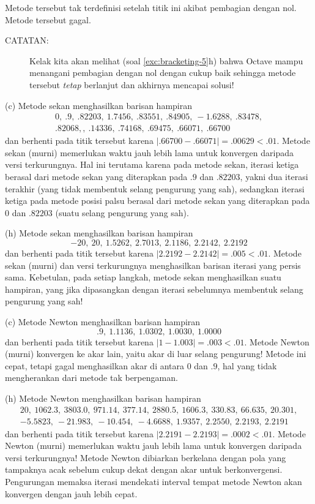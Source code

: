 \begin{description}
Metode tersebut tak terdefinisi setelah titik ini akibat pembagian
dengan nol. Metode tersebut gagal.
\begin{description}
\item [{CATATAN:}] Kelak kita akan melihat (soal \ref{exc:bracketing-5}h)
bahwa Octave mampu menangani pembagian dengan nol dengan cukup baik
sehingga metode tersebut \textit{tetap} berlanjut dan akhirnya mencapai
solusi!
\end{description}
\item [{\ref{exc:bracketing-2}:}] (c) Metode sekan menghasilkan barisan
hampiran
\[
\begin{gathered}0,\ .9,\ .82203,\ 1.7456,\ .83551,\ .84905,\ -1.6288,\ .83478,\\
.82068,,\ .14336,\ .74168,\ .69475,\ .66071,\ .66700
\end{gathered}
\]
dan berhenti pada titik tersebut karena $|.66700-.66071|=.00629<.01$.
Metode sekan (murni) memerlukan waktu jauh lebih lama untuk konvergen
daripada versi terkurungnya. Hal ini terutama karena pada metode sekan,
iterasi ketiga berasal dari metode sekan yang diterapkan pada $.9$
dan $.82203$, yakni dua iterasi terakhir (yang tidak membentuk selang
pengurung yang sah), sedangkan iterasi ketiga pada metode posisi palsu
berasal dari metode sekan yang diterapkan pada $0$ dan $.82203$
(suatu selang pengurung yang sah).

(h) Metode sekan menghasilkan barisan hampiran
\[
-20,\ 20,\ 1.5262,\ 2.7013,\ 2.1186,\ 2.2142,\ 2.2192
\]
dan berhenti pada titik tersebut karena $|2.2192-2.2142|=.005<.01$.
Metode sekan (murni) dan versi terkurungnya menghasilkan barisan iterasi
yang persis sama. Kebetulan, pada setiap langkah, metode sekan menghasilkan
suatu hampiran, yang jika dipasangkan dengan iterasi sebelumnya membentuk
selang pengurung yang sah!
\item [{\ref{exc:bracketing-3}:}] (c) Metode Newton menghasilkan barisan
hampiran
\[
.9,\ 1.1136,\ 1.0302,\ 1.0030,\ 1.0000
\]
dan berhenti pada titik tersebut karena $|1-1.003|=.003<.01$. Metode
Newton (murni) konvergen ke akar lain, yaitu akar di luar selang pengurung!
Metode ini cepat, tetapi gagal menghasilkan akar di antara $0$ dan
$.9$, hal yang tidak mengherankan dari metode tak berpengaman.

(h) Metode Newton menghasilkan barisan hampiran
\[
\begin{gathered}20,\ 1062.3,\ 3803.0,\ 971.14,\ 377.14,\ 2880.5,\ 1606.3,\ 330.83,\ 66.635,\ 20.301,\\
-5.5823,\ -21.983,\ -10.454,\ -4.6688,\ 1.9357,\ 2.2550,\ 2.2193,\ 2.2191
\end{gathered}
\]
dan berhenti pada titik tersebut karena $|2.2191-2.2193|=.0002<.01$.
Metode Newton (murni) memerlukan waktu jauh lebih lama untuk konvergen
daripada versi terkurungnya! Metode Newton dibiarkan berkelana dengan
pola yang tampaknya acak sebelum cukup dekat dengan akar untuk berkonvergensi.
Pengurungan memaksa iterasi mendekati interval tempat metode Newton
akan konvergen dengan jauh lebih cepat.
\end{description}
